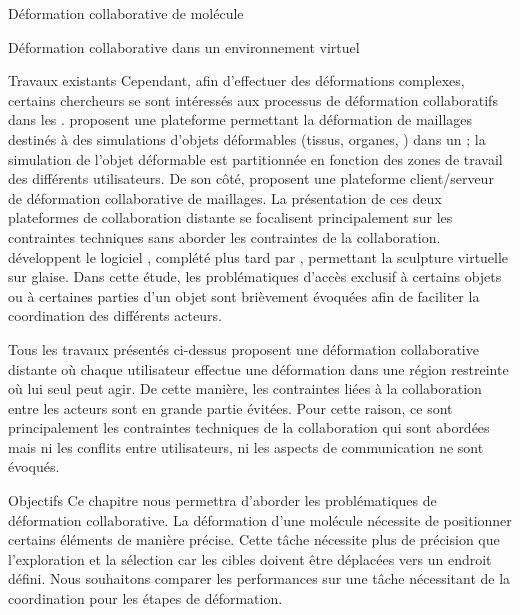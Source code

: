 \documentclass[myfrancais,ngerman,english,french]{mythesis}
\begin{document}
\begin{mychapter}{Déformation collaborative de molécule}
\begin{mysection}{Déformation collaborative dans un environnement virtuel}
\begin{mysubsection}{Travaux existants}
				Cependant, afin d'effectuer des déformations complexes, certains chercheurs se sont intéressés aux processus de déformation collaboratifs dans les .
				 proposent une plateforme permettant la déformation de maillages destinés à des simulations d'objets déformables (tissus, organes, \myetc) dans un ; la simulation de l'objet déformable est partitionnée en fonction des zones de travail des différents utilisateurs.
				De son côté,  proposent une plateforme client/serveur de déformation collaborative de maillages.
				La présentation de ces deux plateformes de collaboration distante se focalisent principalement sur les contraintes techniques sans aborder les contraintes de la collaboration.
				 développent le logiciel \myClayWorks, complété plus tard par , permettant la sculpture virtuelle sur glaise.
				Dans cette étude, les problématiques d'accès exclusif à certains objets ou à certaines parties d'un objet sont brièvement évoquées afin de faciliter la coordination des différents acteurs.

				Tous les travaux présentés ci-dessus proposent une déformation collaborative distante où chaque utilisateur effectue une déformation dans une région restreinte où lui seul peut agir.
				De cette manière, les contraintes liées à la collaboration entre les acteurs sont en grande partie évitées.
				Pour cette raison, ce sont principalement les contraintes techniques de la collaboration qui sont abordées mais ni les conflits entre utilisateurs, ni les aspects de communication ne sont évoqués.
			\end{mysubsection}
			\begin{mysubsection}{Objectifs}
				Ce chapitre nous permettra d'aborder les problématiques de déformation collaborative.
				La déformation d'une molécule nécessite de positionner certains éléments de manière précise.
				Cette tâche nécessite plus de précision que l'exploration et la sélection car les cibles doivent être déplacées vers un endroit défini.
				Nous souhaitons comparer les performances sur une tâche nécessitant de la coordination pour les étapes de déformation.


\end{mysubsection}
\end{mysection}
\end{mychapter}
\end{document}
